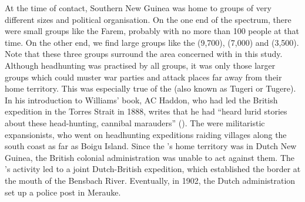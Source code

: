 At the time of contact, Southern New Guinea was home to groups of very different sizes and political organisation. On the one end of the spectrum, there were small groups like the Farem, probably with no more than 100 people at that time. On the other end, we find large groups like the  (9,700),  (7,000) and  (3,500). Note that these three groups surround the area concerned with in this study. Although headhunting was practised by all groups, it was only those larger groups which could muster war parties and attack places far away from their home territory. This was especially true of the  (also known as Tugeri or Tugere). In his introduction to Williams' book, AC Haddon, who had led the British expedition in the Torres Strait in 1888, writes that he had ``heard lurid stories about these head-hunting, cannibal marauders'' (\citeyear[xxiiv]{Williams:1936transfly}). The  were militaristic expansionists, who went on headhunting expeditions raiding villages along the south coast as far as Boigu Island. Since the 's home territory was in Dutch New Guinea, the British colonial administration was unable to act against them. The 's activity led to a joint Dutch-British expedition, which established the border at the mouth of the Bensbach River. Eventually, in 1902, the Dutch administration set up a police post in Merauke.%


